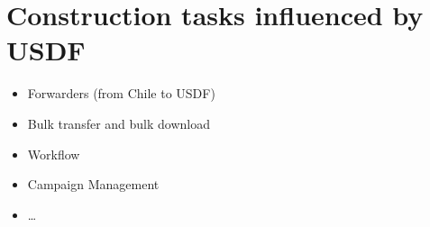 \section{Construction tasks influenced by USDF}\label{sec:construct}


\begin{itemize}
\item Forwarders (from Chile to USDF)
\item Bulk transfer and bulk download
\item Workflow
\item Campaign Management
\item \ldots
\end{itemize}
